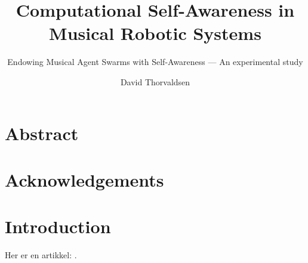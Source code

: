\documentclass[a4paper, english]{article}
\begin{document}
	\title{Computational Self-Awareness in Musical Robotic Systems}
	\subtitle{Endowing Musical Agent Swarms with Self-Awareness — An experimental study}
	\author{David Thorvaldsen}
	\duoforside[dept={Institute for Informatics}, program={Informatics: Robotics and Intelligent Systems}, long]

	\section*{Abstract}
	\newpage

	\section*{Acknowledgements}
	\newpage

	\tableofcontents
	\newpage

	\listoftables
	\newpage

	\listoffigures
	\newpage

	\setcounter{page}{1}









	\section{Introduction}

	Her er en artikkel: \cite{nymoen_synch}.







	\newpage
	\printbibliography
\end{document}
